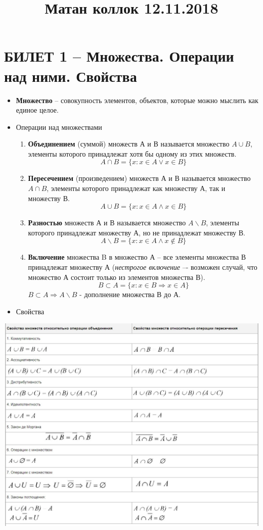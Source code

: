 \documentclass{article}
\title{Матан коллок 12.11.2018}
\begin{document}
\maketitle 
\tableofcontents
\newpage
	\section{БИЛЕТ 1 -- Множества. Операции над ними. Свойства}
\begin{itemize}
\item \textbf{Множество} -- совокупность элементов, объектов, которые можно мыслить как единое целое.
\item Операции над множествами 
	\begin{enumerate}
	\item \textbf{Объединением} (суммой) множеств А и В называется множество $A \cup B$, элементы которого принадлежат хотя бы одному из этих множеств.
$$ A \cap B = \{ x : x \in A  \lor  x \in B \} $$
    \item \textbf{Пересечением} (произведением) множеств А и В называется множество $A \cap B$, элементы которого принадлежат как множеству А, так и множеству В.
$$ A \cup B = \{ x : x \in A \land x \in B \} $$
    \item \textbf{Разностью} множеств А и В называется множество $A \backslash B$, элементы которого принадлежат множеству А, но не принадлежат множеству В. 
    $$ A \backslash B = \{ x : x \in A \land x \notin B \} $$
    \item \textbf{Включение} множества B в множество А -- все элементы множества В принадлежат множеству А (\textit{нестрогое включение} –- возможен случай, что множество А состоит только из элементов множества В).
    $$ B \subset A = \{ x : x \in B \Rightarrow x \in A \} $$
    $ B \subset A \Rightarrow A \backslash B$ - дополнение множества В до А.
	\end{enumerate}
\item Свойства
\newline
\end{itemize}
\begin{center}
\includegraphics[scale=0.5]{1.jpg}
\end{center}
\newpage
\end{document}
